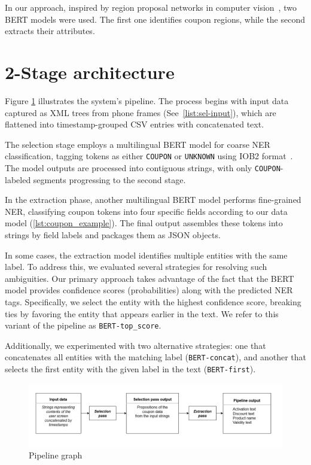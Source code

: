 \documentclass[licencjacka,en]{pracamgr}
\begin{document}
In our approach, inspired by region proposal networks in computer vision~\cite{Region_proposal}, two BERT models were used. The first one identifies coupon regions, while the second extracts their attributes.

\section{2-Stage architecture}
Figure \ref{fig:zpp} illustrates the system's pipeline. The process begins with input data captured as XML trees from phone frames (See~\ref{list:sel-input}), which are flattened into timestamp-grouped CSV entries with concatenated text.

The selection stage employs a multilingual BERT model for coarse NER classification, tagging tokens as either \texttt{COUPON} or \texttt{UNKNOWN} using IOB2 format~\cite{iob2}. The model outputs are processed into contiguous strings, with only \texttt{COUPON}-labeled segments progressing to the second stage.

In the extraction phase, another multilingual BERT model performs fine-grained NER, classifying coupon tokens into four specific fields according to our data model (\ref{lst:coupon_example}). The final output assembles these tokens into strings by field labels and packages them as JSON objects.

In some cases, the extraction model identifies multiple entities with the same label. To address this, we evaluated several strategies for resolving such ambiguities. Our primary approach takes advantage of the fact that the BERT model provides confidence scores (probabilities) along with the predicted NER tags. Specifically, we select the entity with the highest confidence score, breaking ties by favoring the entity that appears earlier in the text. We refer to this variant of the pipeline as \texttt{BERT-top\_score}.

Additionally, we experimented with two alternative strategies: one that concatenates all entities with the matching label (\texttt{BERT-concat}), and another that selects the first entity with the given label in the text (\texttt{BERT-first}).

\begin{figure}
    \centering
    \includegraphics[width=1.0\linewidth]{bachelor_images/zpp.png}
    \caption{Pipeline graph}
    \label{fig:zpp}
\end{figure}
\end{document}
